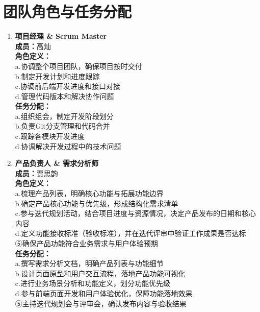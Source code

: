 \section{团队角色与任务分配}
\begin{enumerate}
    \item \textbf{项目经理 \& Scrum Master} \\
          \textbf{成员：}高灿 \\
          \textbf{角色定义：}  \\
          a.协调整个项目团队，确保项目按时交付  \\
          b.制定开发计划和进度跟踪  \\
          c.协调前后端开发进度和接口对接  \\
          d.管理代码版本和解决协作问题  \\
          \textbf{任务分配：}  \\
          a.组织组会，制定开发阶段划分  \\
          b.负责Git分支管理和代码合并  \\
          c.跟踪各模块开发进度  \\
          d.协调解决开发过程中的技术问题  \\

    \item \textbf{产品负责人 \& 需求分析师} \\
          \textbf{成员：}贾思韵\\
          \textbf{角色定义：}  \\
          a.梳理产品列表，明确核心功能与拓展功能边界  \\
          b.确定产品核心功能与优先级，形成结构化需求清单  \\
          c.参与迭代规划活动，结合项目进度与资源情况，决定产品发布的日期和核心内容  \\
          d.定义功能接收标准（验收标准），并在迭代评审中验证工作成果是否达标  \\
          ⑤确保产品功能符合业务需求与用户体验预期  \\
          \textbf{任务分配：}  \\
          a.撰写需求分析文档，明确产品列表与功能细节  \\
          b.设计页面原型和用户交互流程，落地产品功能可视化  \\
          c.进行业务场景分析和功能定义，划分功能优先级  \\
          d.参与前端页面开发和用户体验优化，保障功能落地效果  \\
          ⑤主持迭代规划会与评审会，确认发布内容与验收结果  \\


\end{enumerate}

